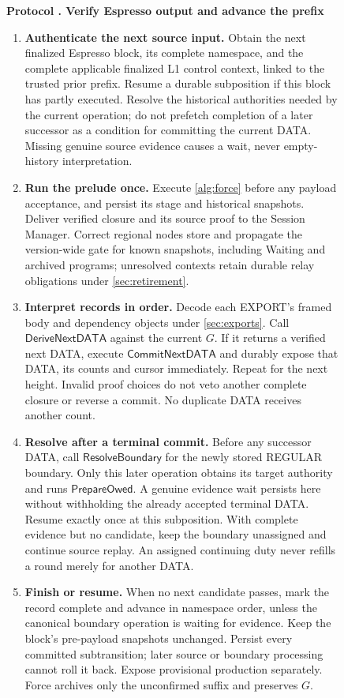 \documentclass[11pt,a4paper]{article}
\newcommand{\tagg}[1]{\ensuremath{\mathsf{#1}}}
\newcounter{protocol}
\newenvironment{protocol}[3][htbp]{\begin{figure}[#1]\refstepcounter{protocol}\label{#2}
\begin{mdframed}[linewidth=.6pt,skipabove=0pt,skipbelow=0pt,
innertopmargin=7pt,innerbottommargin=7pt]\small
\textbf{Protocol \theprotocol. #3}\par\smallskip}{\end{mdframed}\end{figure}}
\begin{document}
\begin{protocol}{alg:external}{Verify Espresso output and advance the prefix}
\begin{enumerate}[label=\textbf{\arabic*)},itemsep=3pt]
\item \textbf{Authenticate the next source input.} Obtain the next
finalized Espresso block, its complete namespace, and the complete
applicable finalized L1 control context, linked to the trusted prior
prefix. Resume a durable subposition if this block has partly executed.
Resolve the historical authorities needed by the current operation;
do not prefetch completion of a later successor as a condition for
committing the current DATA. Missing genuine source evidence causes a
wait, never empty-history interpretation.

\item \textbf{Run the prelude once.} Execute \cref{alg:force} before
any payload acceptance, and persist its stage and historical snapshots.
Deliver verified closure and its source proof to the Session Manager.
Correct regional nodes store and propagate the version-wide gate for
known snapshots, including Waiting and archived programs; unresolved
contexts retain durable relay obligations under \cref{sec:retirement}.

\item \textbf{Interpret records in order.} Decode each EXPORT's
framed body and dependency objects under \cref{sec:exports}. Call
$\tagg{DeriveNextDATA}$ against the current $G$. If it returns a verified
next DATA, execute $\tagg{CommitNextDATA}$ and durably expose that DATA,
its counts and cursor immediately. Repeat for the next height. Invalid
proof choices do not veto another complete closure or reverse a commit.
No duplicate DATA receives another count.

\item \textbf{Resolve after a terminal commit.} Before any successor
DATA, call $\tagg{ResolveBoundary}$ for the newly stored REGULAR
boundary. Only this later operation obtains its target authority and
runs $\tagg{PrepareOwed}$. A genuine evidence wait persists here without
withholding the already accepted terminal DATA. Resume exactly once at
this subposition. With complete evidence but no candidate, keep the
boundary unassigned and continue source replay. An assigned continuing
duty never refills a round merely for another DATA.

\item \textbf{Finish or resume.} When no next candidate passes, mark
the record complete and advance in namespace order, unless the canonical
boundary operation is waiting for evidence. Keep the block's pre-payload
snapshots unchanged. Persist every committed subtransition; later source
or boundary processing cannot roll it back. Expose provisional production
separately. Force archives only the unconfirmed suffix and preserves $G$.
\end{enumerate}
\end{protocol}
\end{document}
